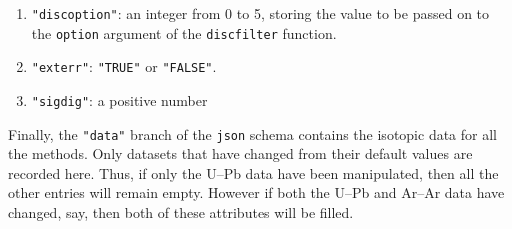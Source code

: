 \begin{refsection}
\begin{enumerate}[leftmargin=\parindent,align=left,
      labelwidth=\parindent,label*=2.\arabic*.]
\begin{enumerate}[leftmargin=\parindent,align=left,
      labelwidth=\parindent,label*=\arabic*.]
      (calculate the discordance after common Pb correction).
    \item{\tt "discoption"}: an integer from 0 to 5, storing the value
      to be passed on to the \texttt{option} argument of the
      \texttt{discfilter} function.
    \item{\tt "exterr"}: \texttt{"TRUE"} or \texttt{"FALSE"}.
    \item{\tt "sigdig"}: a positive number
  \end{enumerate}
\end{enumerate}

Finally, the \texttt{"data"} branch of the \texttt{json} schema
contains the isotopic data for all the methods. Only datasets that
have changed from their default values are recorded here. Thus, if
only the U--Pb data have been manipulated, then all the other entries
will remain empty. However if both the U--Pb and Ar--Ar data have
changed, say, then both of these attributes will be filled.


\end{refsection}
